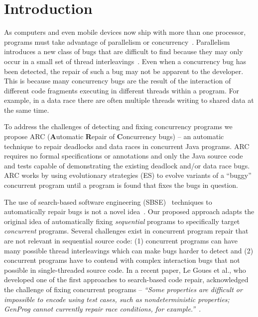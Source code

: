  \section{Introduction}
\label{sec:introduction}

As computers and even mobile devices now ship with more than one processor, programs
must take advantage of parallelism or concurrency~\cite{SL05}. Parallelism introduces a new class of bugs
that are difficult to find because they may only occur in a small set of
thread interleavings~\cite{MQB07}. Even when a concurrency bug has been
detected, the repair of such a bug may not be apparent to the developer. This is because many concurrency bugs are the result of the interaction of different code fragments executing in different threads within a program. For example, in a data race there are often multiple threads writing to shared data at the same time.

To address the challenges of detecting and fixing concurrency programs we propose ARC (\textbf{A}utomatic \textbf{R}epair of \textbf{C}oncurrency
bugs) -- an automatic technique to repair deadlocks and data races in concurrent
Java programs. ARC requires no formal specifications or annotations and only the Java source code and tests capable of demonstrating the existing deadlock
and/or data race bugs. ARC works by using evolutionary strategies (ES) to
evolve variants of a ``buggy'' concurrent program until a program is found that fixes the bugs in
question.

The use of search-based software engineering (SBSE)~\cite{Har+10} techniques to
automatically repair bugs is not a novel idea~\cite{FNWG09, WNLF09, NWLF09,
WFGN10, GNFW11, LDFW12}. Our proposed approach adapts the original idea of
automatically fixing \textit{sequential} programs to specifically target
\textit{concurrent} programs. Several challenges exist in concurrent program repair  that are not relevant in sequential source code: (1) concurrent programs can have many possible thread interleavings which can make bugs harder to detect and (2) concurrent programs have to contend with complex interaction bugs that not possible in single-threaded source code. In a recent paper, Le Goues et al., who developed one of the first approaches to search-based code repair, acknowledged the challenge of fixing concurrent programs -- \textit{``Some properties are difficult or impossible to encode using test cases, such as nondeterministic properties; GenProg cannot currently repair race conditions, for example.''}~\cite{GNFW11}.

